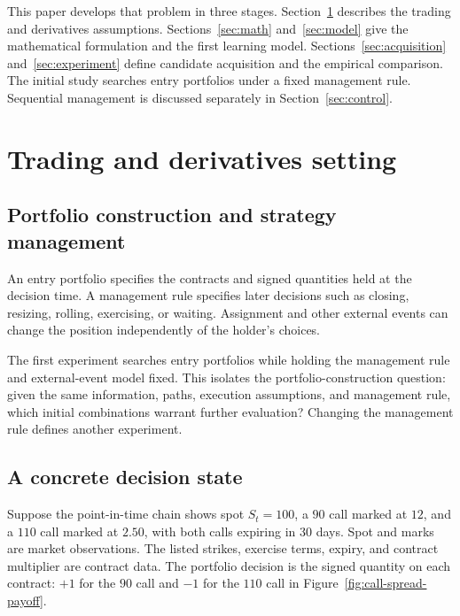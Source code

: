 \documentclass{strategynet-journal}
\begin{document}
This paper develops that problem in three stages.  Section~\ref{sec:trading}
describes the trading and derivatives assumptions.  Sections~\ref{sec:math}
and~\ref{sec:model} give the mathematical formulation and the first learning
model.  Sections~\ref{sec:acquisition} and~\ref{sec:experiment} define
candidate acquisition and the empirical comparison.  The initial study
searches entry portfolios under a fixed management rule.  Sequential
management is discussed separately in Section~\ref{sec:control}.

\section{Trading and derivatives setting}
\label{sec:trading}

\begin{SNcolumns}

\subsection{Portfolio construction and strategy management}

An entry portfolio specifies the contracts and signed quantities held at the
decision time.  A management rule specifies later decisions such as closing,
resizing, rolling, exercising, or waiting.  Assignment and other external
events can change the position independently of the holder's choices.

The first experiment searches entry portfolios while holding the management
rule and external-event model fixed.  This isolates the portfolio-construction
question: given the same information, paths, execution assumptions, and
management rule, which initial combinations warrant further evaluation?
Changing the management rule defines another experiment.

\subsection{A concrete decision state}

Suppose the point-in-time chain shows spot \(S_t=100\), a \(90\) call marked at
\(12\), and a \(110\) call marked at \(2.50\), with both calls expiring in
30 days.  Spot and marks are market observations.  The listed strikes,
exercise terms, expiry, and contract multiplier are contract data.  The
portfolio decision is the signed quantity on each contract: \(+1\) for the
\(90\) call and \(-1\) for the \(110\) call in
Figure~\ref{fig:call-spread-payoff}.


\end{SNcolumns}
\end{document}
